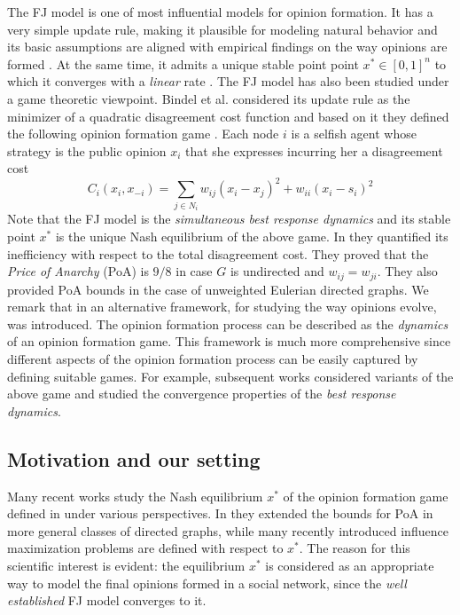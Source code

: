 The FJ model is one of most influential models for opinion formation. It has a
very simple update rule, making it plausible for modeling natural behavior and
its basic assumptions are aligned with empirical findings on the way opinions
are formed \cite{AFH05,K47}.  At the same time, it admits a unique stable point
point $x^* \in [0,1]^n$ to which it converges with a \emph{linear} rate
\cite{GS14}.  The FJ model has also been studied under a game theoretic
viewpoint.  Bindel et al. considered its update rule as the minimizer of a
quadratic disagreement cost function and based on it they defined the following
opinion formation game \cite{BKO11}. Each node $i$ is a selfish agent whose
strategy is the public opinion $x_i$ that she expresses incurring her a
disagreement cost
%
\begin{equation}\label{eq:BKO_cost}
  C_i(x_i,x_{-i})= \sum_{j \in N_i}w_{ij} (x_i-x_j)^2 + w_{ii}(x_i-s_i)^2
\end{equation}
%
Note that the FJ model is the \emph{simultaneous best response dynamics} and
its stable point $x^*$ is the unique Nash equilibrium of the above game.  In
\cite{BKO11} they quantified its inefficiency with respect to the total
disagreement cost. They proved that the \emph{Price of Anarchy} (PoA) is $9/8$
in case $G$ is undirected and $w_{ij}=w_{ji}$. They also provided PoA bounds in
the case of unweighted Eulerian directed graphs.  We remark that in
\cite{BKO11} an alternative framework, for studying the way opinions evolve,
was introduced.  The opinion formation process can be described as the
\emph{dynamics} of an opinion formation game.  This framework is much more
comprehensive since different aspects of the opinion formation process can be
easily captured by defining suitable games.
For example, subsequent works \cite{BGM13,BFM16,EFHS17} considered variants of
the above game and studied the convergence properties of the \emph{best
  response dynamics}.

\subsection{Motivation and our setting}

Many recent works study the Nash equilibrium $x^*$ of the opinion formation
game defined in \cite{BKO11} under various perspectives. In \cite{CCL16} they
extended the bounds for PoA in more general classes of directed graphs, while
many recently introduced influence maximization problems
\cite{GTT13,AKPT18,MMT17} are defined with respect to $x^*$.
The reason for this scientific interest is evident: the equilibrium $x^*$ is
considered as an appropriate way to model the final opinions formed in a social
network, since the \emph{well established} FJ model converges to it.

